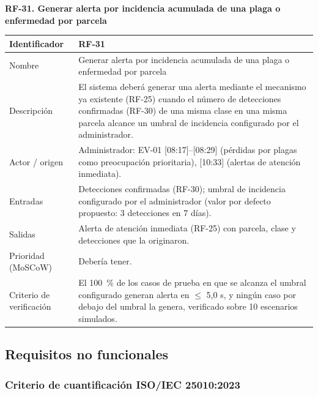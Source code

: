 \documentclass[12pt,a4paper]{article}
\begin{document}
\begin{minipage}{\linewidth}
\bigskip
\noindent\textbf{RF-31. Generar alerta por incidencia acumulada de una plaga o enfermedad por parcela}
\label{tab:RF-31}

\begin{center}
\begin{tabular}{|p{3.5cm}|p{10.7cm}|}
\hline
Identificador & RF-31 \\
\hline
Nombre & Generar alerta por incidencia acumulada de una plaga o enfermedad por parcela \\
\hline
Descripción & El sistema deberá generar una alerta mediante el mecanismo ya existente (RF-25) cuando el número de detecciones confirmadas (RF-30) de una misma clase en una misma parcela alcance un umbral de incidencia configurado por el administrador. \\
\hline
Actor / origen & Administrador: EV-01 [08:17]--[08:29] (pérdidas por plagas como preocupación prioritaria), [10:33] (alertas de atención inmediata). \\
\hline
Entradas & Detecciones confirmadas (RF-30); umbral de incidencia configurado por el administrador (valor por defecto propuesto: 3 detecciones en 7 días). \\
\hline
Salidas & Alerta de atención inmediata (RF-25) con parcela, clase y detecciones que la originaron. \\
\hline
Prioridad (MoSCoW) & Debería tener. \\
\hline
Criterio de verificación & El 100~\% de los casos de prueba en que se alcanza el umbral configurado generan alerta en $\leq$ 5,0 s, y ningún caso por debajo del umbral la genera, verificado sobre 10 escenarios simulados. \\
\hline
\end{tabular}
\end{center}
\end{minipage}

\subsection{Requisitos no funcionales}
\label{sec:requisitos-no-funcionales}

\subsubsection{Criterio de cuantificación ISO/IEC 25010:2023}
\label{sec:criterio-cuantificacion-rnf}
\end{document}
